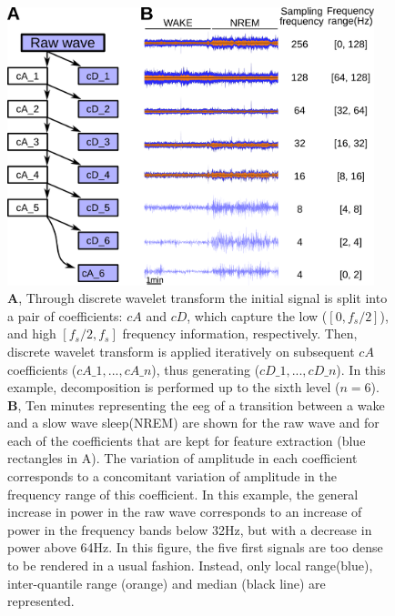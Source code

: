 \begin{figure}[h!]
  \centering   
    \includegraphics[width=0.95\textwidth]{figures/dwd.pdf}
  \caption{
	\textbf{A}, Through discrete wavelet transform the initial signal is split into a pair of coefficients: $cA$ and $cD$, which capture the low ($[0, f_s/2]$), and high $[f_s/2, f_s]$ frequency information, respectively.
	Then, discrete wavelet transform is applied iteratively on subsequent $cA$ coefficients ($cA\_1, ..., cA\_n$), thus generating ($cD\_1, ..., cD\_n$).
	In this example, decomposition is performed up to the sixth level ($n=6$).
	\textbf{B}, 
	Ten minutes representing the \gls{eeg} of a transition between a wake and a slow wave sleep(NREM) are shown for the raw
	 wave and for each of the coefficients that are kept for feature extraction (blue rectangles in A).
	 The variation of amplitude in each coefficient corresponds to a concomitant variation of amplitude in the frequency range of this coefficient.
	 In this example, the general increase in power in the raw wave corresponds to an increase of power in the frequency bands below 32Hz, but with a decrease in power above 64Hz.
	In this figure, the five first signals are too dense to be rendered in a usual fashion. Instead, only local range(blue), inter-quantile range (orange) and median (black line) are represented.
  \label{fig:dwd}
  }
\end{figure}






